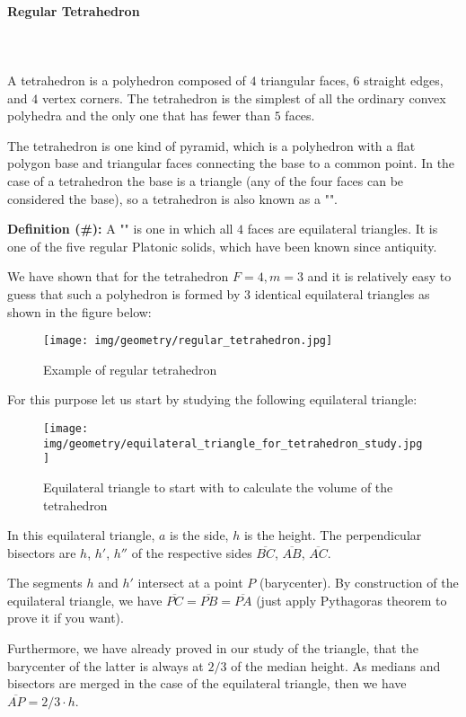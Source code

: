 {	\paragraph{Regular Tetrahedron}\mbox{}\\\\
	A tetrahedron is a polyhedron composed of $4$ triangular faces, $6$ straight edges, and $4$ vertex corners. The tetrahedron is the simplest of all the ordinary convex polyhedra and the only one that has fewer than $5$ faces.
	
	The tetrahedron is one kind of pyramid, which is a polyhedron with a flat polygon base and triangular faces connecting the base to a common point. In the case of a tetrahedron the base is a triangle (any of the four faces can be considered the base), so a tetrahedron is also known as a "".
	
	\textbf{Definition (\#\mydef):} A "" is one in which all $4$ faces are equilateral triangles. It is one of the five regular Platonic solids, which have been known since antiquity.
	
	We have shown that for the tetrahedron $F=4,m=3$ and it is relatively easy to guess that such a polyhedron is formed by $3$ identical equilateral triangles as shown in the figure below:
	\begin{figure}[H]
		\centering
		\texttt{[image: img/geometry/regular\_tetrahedron.jpg]}
		\caption{Example of regular tetrahedron}
	\end{figure}
	For this purpose let us start by studying the following equilateral triangle:
	\begin{figure}[H]
		\centering
		\texttt{[image: img/geometry/equilateral\_triangle\_for\_tetrahedron\_study.jpg]}
		\caption[]{Equilateral triangle to start with to calculate the volume of the tetrahedron}
	\end{figure}
	In this equilateral triangle, $a$ is the side, $h$ is the height. The perpendicular bisectors are $h$, $h'$, $h''$ of the respective sides $\overline{BC}$, $\overline{AB}$, $\overline{AC}$.

	The segments $h$ and $h'$ intersect at a point $P$ (barycenter). By construction of the equilateral triangle, we have $\overline{PC}=\overline{PB}=\overline{PA}$ (just apply Pythagoras theorem to prove it if you want).
	
	Furthermore, we have already proved in our study of the triangle, that the barycenter of the latter is always at $2/3$ of the median height. As medians and bisectors are merged in the case of the equilateral triangle, then we have $\overline{AP}=2/3 \cdot h$.
	
}
